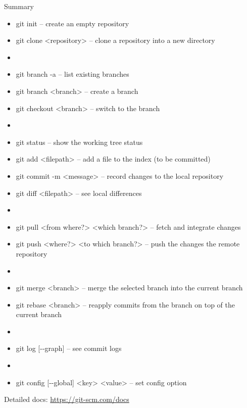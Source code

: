 \begin{frame}{Summary}
	\begin{tiny}
    \begin{itemize}
        \item[] {\color{eclipseBlue}git init} -- create an empty repository
        \item[] {\color{eclipseBlue}git clone <repository>} -- clone a repository into a new directory
        \item[]
        \item[] {\color{eclipseBlue}git branch -a} -- list existing branches
        \item[] {\color{eclipseBlue}git branch <branch>} -- create a branch
        \item[] {\color{eclipseBlue}git checkout <branch>} -- switch to the branch 
        \item[]
        \item[] {\color{eclipseBlue}git status} -- show the working tree status
        \item[] {\color{eclipseBlue}git add <filepath>} -- add a file to the index (to be committed)
        \item[] {\color{eclipseBlue}git commit -m <message>} -- record changes to the local repository
        \item[] {\color{eclipseBlue}git diff <filepath>} -- see local differences 

        \item[]
        \item[] {\color{eclipseBlue}git pull <from where?> <which branch?>} -- fetch and integrate changes
        \item[] {\color{eclipseBlue}git push <where?> <to which branch?>} -- push the changes the remote repository
        \item[]
        \item[] {\color{eclipseBlue}git merge <branch>} -- merge the selected branch into the current branch
        \item[] {\color{eclipseBlue}git rebase <branch>} -- reapply commits from the branch on top of the current branch
        \item[]
        \item[] {\color{eclipseBlue}git log [-{}-graph]} -- see commit logs
        \item[]
        \item[] {\color{eclipseBlue}git config [-{}-global] <key> <value>} -- set config option
    \end{itemize}
    
    \begin{center}
    	Detailed docs: \url{https://git-scm.com/docs}
    \end{center}
    \end{tiny}
\end{frame}

